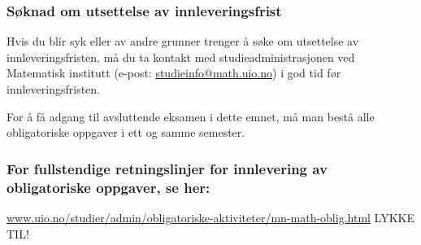 \documentclass[11pt,
               a4paper,
               article,
               oneside,
               oldfontcommands,
               norsk]{memoir}
\begin{document}
\begin{titlingpage}
    \subsubsection*{S{\o}knad om utsettelse av innleveringsfrist}
    Hvis du blir syk eller av andre grunner trenger {\aa} s{\o}ke om utsettelse av innleverings\-fristen, m{\aa} du ta kontakt med studieadministrasjonen ved Matematisk institutt (e-post: \href{mailto:studieinfo@math.uio.no}{studieinfo@math.uio.no}) i god tid f{\o}r innleveringsfristen. 

    For {\aa} f{\aa} adgang til avsluttende eksamen i dette emnet, m{\aa} man best{\aa} alle obliga\-toriske oppgaver i ett og samme semester.

    \subsubsection*{For fullstendige retningslinjer for innlevering av obligatoriske oppgaver, se her:}
    \begin{center}
        \href{http://www.uio.no/studier/admin/obligatoriske-aktiviteter/mn-math-oblig.html}
        {\underline{www.uio.no/studier/admin/obligatoriske-aktiviteter/mn-math-oblig.html}}
        \vspace{1ex}        
        \vfill
        LYKKE TIL!
    \end{center}
\end{titlingpage}


\noindent


\end{document}
